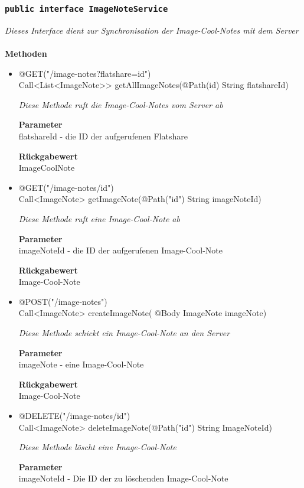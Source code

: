 	\subsubsection{\texttt{public interface ImageNoteService }}
\textit{Dieses Interface dient zur Synchronisation der Image-Cool-Notes mit dem Server}\\
\\
	\textbf{Methoden} \\
		\begin{itemize}
		\item{@GET("/image-notes?flatshare={id}")\\
Call<List<ImageNote>> getAllImageNotes(@Path(\grqq id\grqq) String flatshareId)}

		\textit{Diese Methode ruft die Image-Cool-Notes vom Server ab}

		\textbf{Parameter} \\
	flatshareId - die ID der aufgerufenen Flatshare   

		\textbf{Rückgabewert} \\
	ImageCoolNote

      \item{@GET("/image-notes/{id}")\\ Call<ImageNote> getImageNote(@Path("\grqq id\grqq") String imageNoteId)}

		\textit{Diese Methode ruft eine Image-Cool-Note ab }

		\textbf{Parameter} \\
		 imageNoteId - die ID der aufgerufenen Image-Cool-Note  

		\textbf{Rückgabewert} \\
	Image-Cool-Note

	\item{@POST("/image-notes")\\ Call<ImageNote> createImageNote( @Body ImageNote imageNote)}

		\textit{Diese Methode schickt ein Image-Cool-Note an den Server}

		\textbf{Parameter} \\
		 imageNote - eine Image-Cool-Note  

		\textbf{Rückgabewert} \\
	Image-Cool-Note

	     \item{@DELETE("/image-notes/{id}")\\Call<ImageNote> deleteImageNote(@Path("\grqq id\grqq") String ImageNoteId)}

		\textit{Diese Methode löscht eine Image-Cool-Note}

		\textbf{Parameter} \\
		 imageNoteId - Die ID der zu löschenden Image-Cool-Note  

	 \end{itemize}


